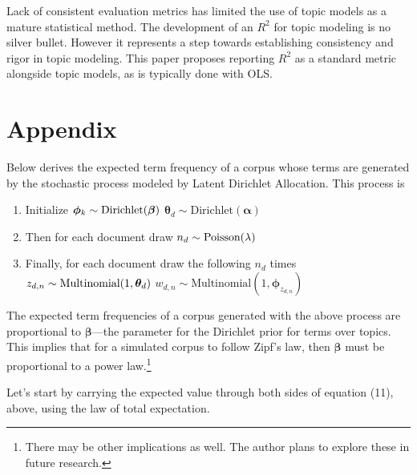 \documentclass[conference,final,]{IEEEtran}
\providecommand{\tightlist}{%
  \setlength{\itemsep}{0pt}\setlength{\parskip}{0pt}}
\begin{document}
Lack of consistent evaluation metrics has limited the use of topic
models as a mature statistical method. The development of an \(R^2\) for
topic modeling is no silver bullet. However it represents a step towards
establishing consistency and rigor in topic modeling. This paper
proposes reporting \(R^2\) as a standard metric alongside topic models,
as is typically done with OLS.

\newpage

\hypertarget{appendix}{%
\section{Appendix}\label{appendix}}

Below derives the expected term frequency of a corpus whose terms are
generated by the stochastic process modeled by Latent Dirichlet
Allocation. This process is

\begin{enumerate}
\def\labelenumi{\arabic{enumi}.}
\tightlist
\item
  Initialize
  \(\\ \boldsymbol\phi_k \sim \text{Dirichlet}(\boldsymbol\beta)\\\)
  \(\boldsymbol\theta_d \sim \text{Dirichlet}(\boldsymbol\alpha)\)
\item
  Then for each document draw \(\\ n_d \sim \text{Poisson}(\lambda)\)
\item
  Finally, for each document draw the following \(n_d\) times
  \(\\ z_{d,n} \sim \text{Multinomial}(1, \boldsymbol\theta_d)\\\)
  \(w_{d,n} \sim \text{Multinomial}(1, \boldsymbol\phi_{z_{d,n}})\)
\end{enumerate}

The expected term frequencies of a corpus generated with the above
process are proportional to \(\boldsymbol\beta\)---the parameter for the
Dirichlet prior for terms over topics. This implies that for a simulated
corpus to follow Zipf's law, then \(\boldsymbol\beta\) must be
proportional to a power law.\footnote{There may be other implications as
  well. The author plans to explore these in future research.}

Let's start by carrying the expected value through both sides of
equation (11), above, using the law of total expectation.
\end{document}
